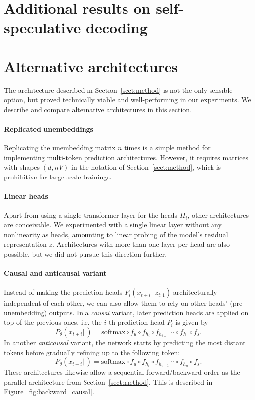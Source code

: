 
\renewcommand{\thefigure}{S\arabic{figure}}
\renewcommand{\thetable}{S\arabic{table}}
\newpage
\appendix
\onecolumn

\section{Additional results on self-speculative decoding}
\label{app:decoding}




\newpage

\section{Alternative architectures}
\label{app:architecture}

The architecture described in Section~\ref{sect:method} is not the only sensible option, but proved technically viable and well-performing in our experiments. We describe and compare alternative architectures in this section.
\paragraph{Replicated unembeddings}
Replicating the unembedding matrix $n$ times is a simple method for implementing multi-token prediction architectures. However, it requires matrices with shapes $(d, nV)$ in the notation of Section~\ref{sect:method}, which is prohibitive for large-scale trainings. 

\paragraph{Linear heads}
Apart from using a single transformer layer for the heads $H_i$, other architectures are conceivable. We experimented with a single linear layer without any nonlinearity as heads, amounting to linear probing of the model's residual representation $z$. Architectures with more than one layer per head are also possible, but we did not pursue this direction further.

\paragraph{Causal and anticausal variant}
Instead of making the prediction heads $P_i(x_{t+i}\,|\,z_{t:1})$ architecturally independent of each other, we can also allow them to rely on other heads' (pre-unembedding) outputs. In a \emph{causal} variant, later prediction heads are applied on top of the previous ones, i.e. the $i$-th prediction head $P_i$ is given by 
\[ P_\theta(x_{t+i}|\cdot) = \mathrm{softmax} \circ f_u \circ f_{h_i} \circ f_{h_{i-1}} \cdots \circ f_{h_1} \circ f_s. \]
In another \emph{anticausal} variant, the network starts by predicting the most distant tokens before gradually refining up to the following token:
\[ P_\theta(x_{t+i}|\cdot) = \mathrm{softmax} \circ f_u \circ f_{h_i} \circ f_{h_{i+1}} \cdots \circ f_{h_{n}} \circ f_s. \]
These architectures likewise allow a sequential forward/backward order as the parallel architecture from Section~\ref{sect:method}. This is described in Figure~\ref{fig:backward_causal}.

